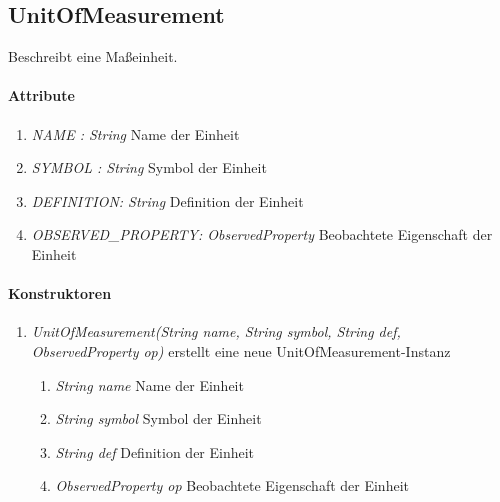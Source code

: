 \subsection*{UnitOfMeasurement}\label{uom}
Beschreibt eine Maßeinheit.

\paragraph{Attribute}
\begin{enumerate}[$\bullet$]
	\item \textit{NAME : String} Name der Einheit
	\item \textit{SYMBOL : String} Symbol der Einheit
	\item \textit{DEFINITION: String} Definition der Einheit
	\item \textit{OBSERVED\_PROPERTY: ObservedProperty} Beobachtete Eigenschaft der Einheit
\end{enumerate}

\paragraph{Konstruktoren}
\begin{enumerate}[+]
	\item \textit{ UnitOfMeasurement(String name, String symbol, String def, ObservedProperty op)}
	erstellt eine neue UnitOfMeasurement-Instanz
	\begin{enumerate}[$\bullet$]
		\item \textit{String name} Name der Einheit
		\item \textit{String symbol} Symbol der Einheit
		\item \textit{String def} Definition der Einheit
		\item \textit{ObservedProperty op} Beobachtete Eigenschaft der Einheit
	\end{enumerate}
	
\end{enumerate}
